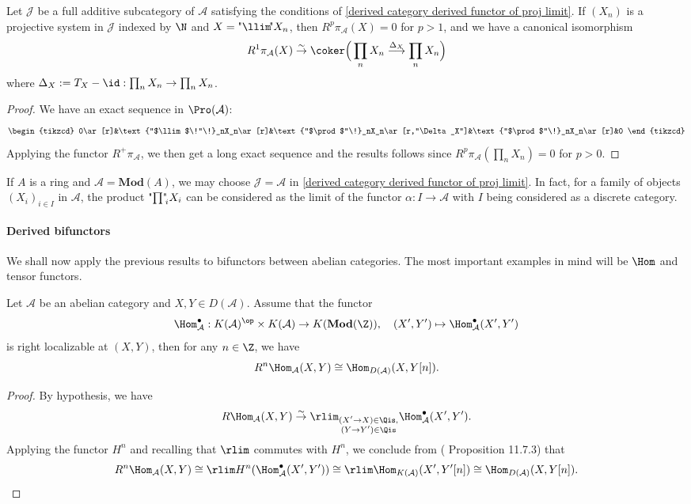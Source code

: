 \begin{corollary}
Let $\mathcal{J}$ be a full additive subcategory of $\mathcal{A}$ satisfying the conditions of \cref{derived category derived functor of proj limit}. If $(X_n)$ is a projective system in $\mathcal{J}$ indexed by $\N$ and $X=\text{"$\llim$\!"}X_n$, then $R^p\pi_\mathcal{A}(X)=0$ for $p>1$, and we have a canonical isomorphism
\[R^1\pi_\mathcal{A}(X)\stackrel{\sim}{\to} \coker\Big(\prod_nX_n\stackrel{\Delta_X}{\longrightarrow}\prod_nX_n\Big)\]
where $\Delta_X:=T_X-\id:\prod_nX_n\to\prod_nX_n$.
\end{corollary}
\begin{proof}
We have an exact sequence in $\Pro(\mathcal{A})$:
\[\begin{tikzcd}
0\ar[r]&\text{"$\llim$\!"\!}_nX_n\ar[r]&\text{"$\prod$"\!}_nX_n\ar[r,"\Delta_X"]&\text{"$\prod$"\!}_nX_n\ar[r]&0
\end{tikzcd}\]
Applying the functor $R^+\pi_\mathcal{A}$, we then get a long exact sequence and the results follows since $R^p\pi_\mathcal{A}(\prod_nX_n)=0$ for $p>0$.
\end{proof}

\begin{example}
If $A$ is a ring and $\mathcal{A}=\mathbf{Mod}(A)$, we may choose $\mathcal{J}=\mathcal{A}$ in \cref{derived category derived functor of proj limit}. In fact, for a family of objects $(X_i)_{i\in I}$ in $\mathcal{A}$, the product $\text{"$\prod$"\!}_iX_i$ can be considered as the limit of the functor $\alpha:I\to\mathcal{A}$ with $I$ being considered as a discrete category.
\end{example}

\paragraph{Derived bifunctors}
We shall now apply the previous results to bifunctors between abelian categories. The most important examples in mind will be $\Hom$ and tensor functors.
\begin{theorem}\label{derived category R^0Hom is Hom in D(A)}
Let $\mathcal{A}$ be an abelian category and $X,Y\in D(\mathcal{A})$. Assume that the functor
\[\Hom_\mathcal{A}^\bullet:K(\mathcal{A})^{\op}\times K(\mathcal{A})\to K(\mathbf{Mod}(\Z)),\quad (X',Y')\mapsto \Hom_\mathcal{A}^{\bullet}(X',Y')\]
is right localizable at $(X,Y)$, then for any $n\in\Z$, we have
\[R^n\Hom_\mathcal{A}(X,Y)\cong\Hom_{D(\mathcal{A})}(X,Y[n]).\]
\end{theorem}
\begin{proof}
By hypothesis, we have
\[R\Hom_\mathcal{A}(X,Y)\stackrel{\sim}{\to} \rlim_{\substack{(X'\to X)\in\Qis,\\(Y\to Y')\in\Qis}}\Hom_\mathcal{A}^\bullet(X',Y').\]
Applying the functor $H^n$ and recalling that $\rlim$ commutes with $H^n$, we conclude from (\cite{kashiwara_SAC} Proposition 11.7.3) that
\begin{equation*}
R^n\Hom_\mathcal{A}(X,Y)\cong \rlim H^n(\Hom_\mathcal{A}^\bullet(X',Y'))\cong \rlim \Hom_{K(\mathcal{A})}(X',Y'[n])\cong\Hom_{D(\mathcal{A})}(X,Y[n]).\qedhere
\end{equation*}
\end{proof}

